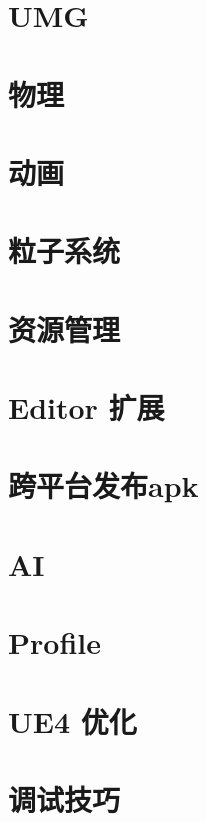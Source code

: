 \documentclass[UTF8,a4paper,12pt]{ctexbook}
\begin{document}
\chapter{UMG}
		
\chapter{物理}
		
\chapter{动画}
	
\chapter{粒子系统}
							
\chapter{资源管理}

\chapter{Editor 扩展}
		
\chapter{跨平台发布apk}

\chapter{AI}

\chapter{Profile}
	
\chapter{UE4 优化}

\chapter{调试技巧}
	
\end{document}
